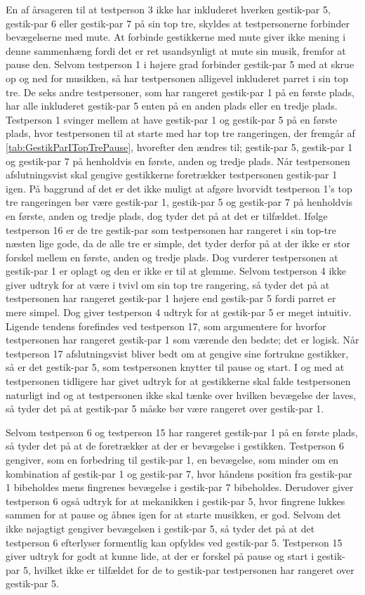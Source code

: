 En af årsageren til at testperson 3 ikke har inkluderet hverken gestik-par 5, gestik-par 6 eller gestik-par 7 på sin top tre, skyldes at testpersonerne forbinder bevægelserne med mute. At forbinde gestikkerne med mute giver ikke mening i denne sammenhæng fordi det er ret usandsynligt at mute sin musik, fremfor at pause den. Selvom testperson 1 i højere grad forbinder gestik-par 5 med at skrue op og ned for musikken, så har testpersonen alligevel inkluderet parret i sin top tre. 	 
De seks andre testpersoner, som har rangeret gestik-par 1 på en første plads, har alle inkluderet gestik-par 5 enten på en anden plads eller en tredje plads. Testperson 1 svinger mellem at have gestik-par 1 og gestik-par 5 på en første plads, hvor testpersonen til at starte med har top tre rangeringen, der fremgår af \autoref{tab:GestikParITopTrePause}, hvorefter den ændres til; gestik-par 5, gestik-par 1 og gestik-par 7 på henholdvis en første, anden og tredje plads. Når testpersonen afslutningsvist skal gengive gestikkerne foretrækker testpersonen gestik-par 1 igen. På baggrund af det er det ikke muligt at afgøre hvorvidt testperson 1's top tre rangeringen bør være gestik-par 1, gestik-par 5 og gestik-par 7 på henholdvis en første, anden og tredje plads, dog tyder det på at det er tilfældet. Ifølge testperson 16 er de tre gestik-par som testpersonen har rangeret i sin top-tre næsten lige gode, da de alle tre er simple, det tyder derfor på at der ikke er stor forskel mellem en første, anden og tredje plads. Dog vurderer testpersonen at gestik-par 1 er oplagt og den er ikke er til at glemme. Selvom testperson 4 ikke giver udtryk for at være i tvivl om sin top tre rangering, så tyder det på at testpersonen har rangeret gestik-par 1 højere end gestik-par 5 fordi parret er mere simpel. Dog giver testperson 4 udtryk for at gestik-par 5 er meget intuitiv. Ligende tendens forefindes ved testperson 17, som argumentere for hvorfor testpersonen har rangeret gestik-par 1 som værende den bedste; det er logisk. Når testperson 17 afslutningsvist bliver bedt om at gengive sine fortrukne gestikker, så er det gestik-par 5, som testpersonen knytter til pause og start. I og med at testpersonen tidligere har givet udtryk for at gestikkerne skal falde testpersonen naturligt ind og at testpersonen ikke skal tænke over hvilken bevægelse der laves, så tyder det på at gestik-par 5 måske bør være rangeret over gestik-par 1.   

Selvom testperson 6 og testperson 15 har rangeret gestik-par 1 på en første plads, så tyder det på at de foretrækker at der er bevægelse i gestikken. Testperson 6 gengiver, som en forbedring til gestik-par 1, en bevægelse, som minder om en kombination af gestik-par 1 og gestik-par 7, hvor håndens position fra gestik-par 1 bibeholdes mens fingrenes bevægelse i gestik-par 7 bibeholdes. Derudover giver testperson 6 også udtryk for at mekanikken i gestik-par 5, hvor fingrene lukkes sammen for at pause og åbnes igen for at starte musikken, er god. Selvom det ikke nøjagtigt gengiver bevægelsen i gestik-par 5, så tyder det på at det testperson 6 efterlyser formentlig kan opfyldes ved gestik-par 5. Testperson 15 giver udtryk for godt at kunne lide, at der er forskel på pause og start i gestik-par 5, hvilket ikke er tilfældet for de to gestik-par testpersonen har rangeret over gestik-par 5. 


